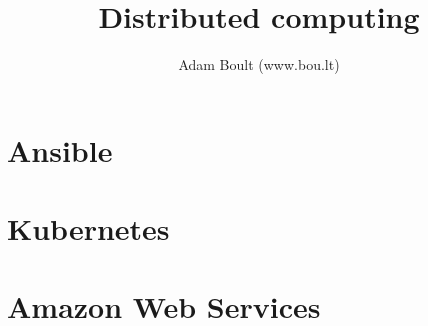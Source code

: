 \documentclass[oneside]{book}
\begin{document}
\author{Adam Boult (www.bou.lt)}
\title{Distributed computing}
\maketitle

\setcounter{tocdepth}{0}
\tableofcontents



\part{Ansible}


\part{Kubernetes}


\part{Amazon Web Services}

\end{document}
